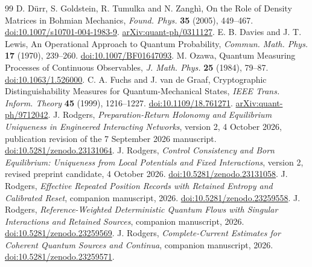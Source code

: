 \documentclass[11pt]{article}
\numberwithin{equation}{section}
\theoremstyle{definition}
\theoremstyle{remark}
\begin{document}
\begin{thebibliography}{99}
 D. D\"urr, S. Goldstein, R. Tumulka and N. Zangh\`i, On the Role of Density Matrices in Bohmian Mechanics, \emph{Found. Phys.} \textbf{35} (2005), 449--467. \href{https://doi.org/10.1007/s10701-004-1983-9}{doi:10.1007/s10701-004-1983-9}. \href{https://arxiv.org/abs/quant-ph/0311127}{arXiv:quant-ph/0311127}.
 E. B. Davies and J. T. Lewis, An Operational Approach to Quantum Probability, \emph{Commun. Math. Phys.} \textbf{17} (1970), 239--260. \href{https://doi.org/10.1007/BF01647093}{doi:10.1007/BF01647093}.
 M. Ozawa, Quantum Measuring Processes of Continuous Observables, \emph{J. Math. Phys.} \textbf{25} (1984), 79--87. \href{https://doi.org/10.1063/1.526000}{doi:10.1063/1.526000}.
 C. A. Fuchs and J. van de Graaf, Cryptographic Distinguishability Measures for Quantum-Mechanical States, \emph{IEEE Trans. Inform. Theory} \textbf{45} (1999), 1216--1227. \href{https://doi.org/10.1109/18.761271}{doi:10.1109/18.761271}. \href{https://arxiv.org/abs/quant-ph/9712042}{arXiv:quant-ph/9712042}.
 J. Rodgers, \emph{Preparation-Return Holonomy and Equilibrium Uniqueness in Engineered Interacting Networks}, version 2, 4 October 2026, publication revision of the 7 September 2026 manuscript. \href{https://doi.org/10.5281/zenodo.23131064}{doi:10.5281/zenodo.23131064}.
 J. Rodgers, \emph{Control Consistency and Born Equilibrium: Uniqueness from Local Potentials and Fixed Interactions}, version 2, revised preprint candidate, 4 October 2026. \href{https://doi.org/10.5281/zenodo.23131058}{doi:10.5281/zenodo.23131058}.
 J. Rodgers, \emph{Effective Repeated Position Records with Retained Entropy and Calibrated Reset}, companion manuscript, 2026. \href{https://doi.org/10.5281/zenodo.23259558}{doi:10.5281/zenodo.23259558}.
 J. Rodgers, \emph{Reference-Weighted Deterministic Quantum Flows with Singular Interactions and Retained Sources}, companion manuscript, 2026. \href{https://doi.org/10.5281/zenodo.23259569}{doi:10.5281/zenodo.23259569}.
 J. Rodgers, \emph{Complete-Current Estimates for Coherent Quantum Sources and Continua}, companion manuscript, 2026. \href{https://doi.org/10.5281/zenodo.23259571}{doi:10.5281/zenodo.23259571}.
\end{thebibliography}
\end{document}

